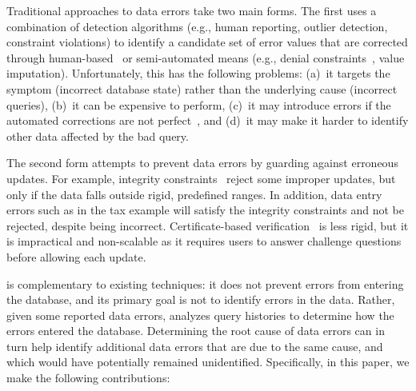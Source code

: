 % 
Traditional approaches to data errors take two main forms. The first
uses a combination of detection algorithms (e.g., human reporting,
outlier detection, constraint violations) to identify a candidate set
of error values that are corrected through
human-based~\cite{haasclamshell,Gokhale:2014wv,Kandel:2011vj} or
semi-automated means (e.g., denial constraints~\cite{ChuIP13}, value
imputation). Unfortunately, this has the following problems: (a)~it targets the symptom (incorrect
database state) rather than the underlying cause (incorrect queries),
(b)~it can be expensive to perform, (c)~it may introduce errors if
the automated corrections are not perfect~\cite{paolo study}, and (d)~it may make it harder to identify other data affected by the bad query.

The second form attempts to prevent data errors by guarding against erroneous updates.  For example, integrity constraints~\cite{Khoussainova2006} reject some improper updates, but only if the data falls outside rigid, predefined ranges.  In addition, data entry errors such as in the tax example will satisfy the integrity constraints and not be rejected, despite being incorrect.  Certificate-based verification~\cite{Chen2011} is less rigid, but it is impractical and non-scalable as it requires users to answer challenge questions before allowing each update.

\sys is complementary to existing techniques: it does not prevent errors from entering the database, and its primary goal is not to identify errors in the data.  Rather, given some reported data errors, \sys analyzes query histories to determine how the errors entered the database. Determining the root cause of data errors can in turn help identify additional data errors that are due to the same cause, and which would have potentially remained unidentified.  Specifically, in this paper, we make the following contributions:

